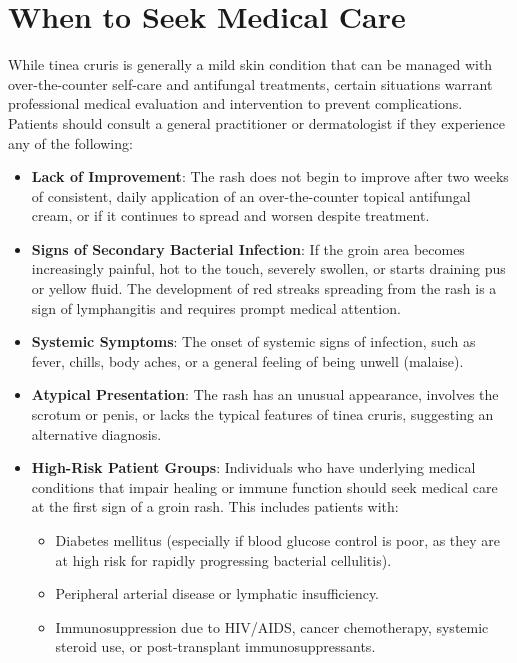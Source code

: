 \section*{When to Seek Medical Care}
While tinea cruris is generally a mild skin condition that can be managed with over-the-counter self-care and antifungal treatments, certain situations warrant professional medical evaluation and intervention to prevent complications.
Patients should consult a general practitioner or dermatologist if they experience any of the following:
\begin{itemize}
    \item \textbf{Lack of Improvement}: The rash does not begin to improve after two weeks of consistent, daily application of an over-the-counter topical antifungal cream, or if it continues to spread and worsen despite treatment.
    \item \textbf{Signs of Secondary Bacterial Infection}: If the groin area becomes increasingly painful, hot to the touch, severely swollen, or starts draining pus or yellow fluid. The development of red streaks spreading from the rash is a sign of lymphangitis and requires prompt medical attention.
    \item \textbf{Systemic Symptoms}: The onset of systemic signs of infection, such as fever, chills, body aches, or a general feeling of being unwell (malaise).
    \item \textbf{Atypical Presentation}: The rash has an unusual appearance, involves the scrotum or penis, or lacks the typical features of tinea cruris, suggesting an alternative diagnosis.
    \item \textbf{High-Risk Patient Groups}: Individuals who have underlying medical conditions that impair healing or immune function should seek medical care at the first sign of a groin rash. This includes patients with:
    \begin{itemize}
        \item Diabetes mellitus (especially if blood glucose control is poor, as they are at high risk for rapidly progressing bacterial cellulitis).
        \item Peripheral arterial disease or lymphatic insufficiency.
        \item Immunosuppression due to HIV/AIDS, cancer chemotherapy, systemic steroid use, or post-transplant immunosuppressants.
    \end{itemize}
\end{itemize}

